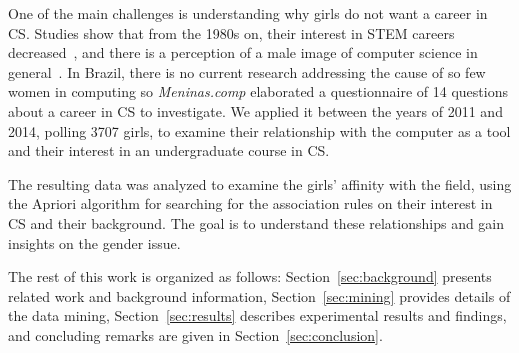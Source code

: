 One of the main challenges is understanding why girls do not want a career in CS. Studies show that from the 1980s on, their interest in STEM careers decreased~\cite{Abbate_2012}, and there is a perception of a male image of computer science in general~\cite{Mercier_2006}. In Brazil, there is no current research addressing the cause of so few women in computing so \emph{Meninas.comp} elaborated a questionnaire of 14 questions about a career in CS to investigate. We applied it between the years of 2011 and 2014,  polling 3707 girls, to examine their relationship with the computer as a tool and their interest in an undergraduate course in CS.

The resulting data was analyzed to examine the girls' affinity with the field, using the Apriori algorithm for searching for the association rules on their interest in CS and their background. The goal is to understand these relationships and gain insights on the gender issue.

The rest of this work is organized as follows: Section~\ref{sec:background} presents related work and background information, Section~\ref{sec:mining}  provides details of the data mining, Section~\ref{sec:results} describes experimental results and findings, and concluding remarks are given in Section~\ref{sec:conclusion}.

